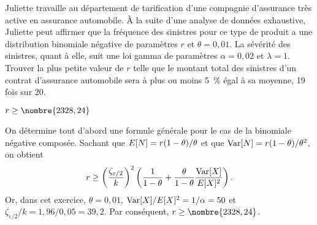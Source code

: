 \begin{exercice}
  \label{ex:stabilite:rBNC}
  Juliette travaille au département de tarification d'une compagnie
  d'assurance très active en assurance automobile. À la suite d'une
  analyse de données exhaustive, Juliette peut affirmer que la
  fréquence des sinistres pour ce type de produit a une distribution
  binomiale négative de paramètres $r$ et $\theta = 0,01$. La sévérité
  des sinistres, quant à elle, suit une loi gamma de paramètres
  $\alpha = 0,02$ et $\lambda = 1$. Trouver la plus petite valeur de
  $r$ telle que le montant total des sinistres d'un contrat
  d'assurance automobile sera à plus ou moins 5~\% égal à sa moyenne,
  19 fois sur 20.
  \begin{rep}
    $r \geq \nombre{2328,24}$
  \end{rep}
  \begin{sol}
    On détermine tout d'abord une formule générale pour le cas de la
    binomiale négative composée. Sachant que $E [ N ] = r(1 -
    \theta)/\theta$ et que $\operatorname{Var} [ N ] = r (1 - \theta)/\theta^2$, on
    obtient
    \begin{displaymath}
      r \geq
      \left(
        \frac{\zeta_{\varepsilon/2}}{k}
      \right)^2
      \left(
        \frac{1}{1 - \theta} +
        \frac{\theta}{1-\theta} \frac{\operatorname{Var} [ X ]}{E [ X ]^2}
      \right).
    \end{displaymath}
    Or, dans cet exercice, $\theta = 0,01$, $\operatorname{Var} [ X ]/E [ X ]^2 =
    1/\alpha = 50$ et $\zeta_{\varepsilon/2}/k = 1,96/0,05 = 39,2$. Par
    conséquent, $r \geq \nombre{2328,24}$.
  \end{sol}
\end{exercice}

